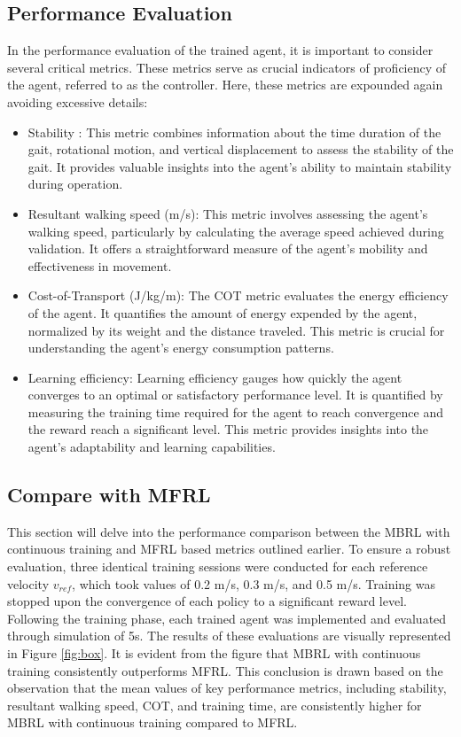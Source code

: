 \subsection{Performance Evaluation}
In the performance evaluation of the trained agent, it is important to consider several critical metrics. These metrics serve as crucial indicators of proficiency of the agent, referred to as the controller. Here, these metrics are expounded again avoiding excessive details:
\begin{itemize}
    \item Stability : This metric combines information about the time duration of the gait, rotational motion, and vertical displacement to assess the stability of the gait. It provides valuable insights into the agent's ability to maintain stability during operation. 
    \item Resultant walking speed (m/s): This metric involves assessing the agent's walking speed, particularly by calculating the average speed achieved during validation. It offers a straightforward measure of the agent's mobility and effectiveness in movement.
    \item Cost-of-Transport (J/kg/m):  The COT metric evaluates the energy efficiency of the agent. It quantifies the amount of energy expended by the agent, normalized by its weight and the distance traveled. This metric is crucial for understanding the agent's energy consumption patterns.
    \item Learning efficiency:  Learning efficiency gauges how quickly the agent converges to an optimal or satisfactory performance level. It is quantified by measuring the training time required for the agent to reach convergence and the reward reach a significant level. This metric provides insights into the agent's adaptability and learning capabilities.
\end{itemize}

\subsection{Compare with MFRL}
This section will delve into the performance comparison between the MBRL with continuous training and MFRL based metrics outlined earlier. To ensure a robust evaluation, three identical training sessions were conducted for each reference velocity $v_{ref}$, which took values of 0.2 m/s, 0.3 m/s, and 0.5 m/s. Training was stopped upon the convergence of each policy to a significant reward level. Following the training phase, each trained agent was implemented and evaluated through simulation of 5s. The results of these evaluations are visually represented in Figure \ref{fig:box}. It is evident from the figure that MBRL with continuous training consistently outperforms MFRL. This conclusion is drawn based on the observation that the mean values of key performance metrics, including stability, resultant walking speed, COT, and training time, are consistently higher for MBRL with continuous training compared to MFRL. 

